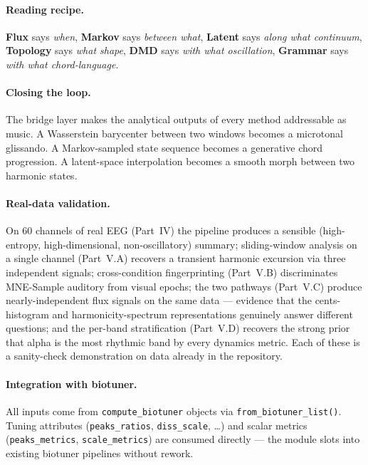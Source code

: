 \documentclass[11pt,a4paper]{article}
\begin{document}
\paragraph{Reading recipe.} \textbf{Flux} says \emph{when}, \textbf{Markov}
says \emph{between what}, \textbf{Latent} says \emph{along what
continuum}, \textbf{Topology} says \emph{what shape}, \textbf{DMD} says
\emph{with what oscillation}, \textbf{Grammar} says \emph{with what
chord-language}.

\paragraph{Closing the loop.} The bridge layer makes the analytical
outputs of every method addressable as music. A Wasserstein barycenter
between two windows becomes a microtonal glissando. A Markov-sampled
state sequence becomes a generative chord progression. A latent-space
interpolation becomes a smooth morph between two harmonic states.

\paragraph{Real-data validation.} On 60 channels of real EEG (Part~IV)
the pipeline produces a sensible (high-entropy, high-dimensional,
non-oscillatory) summary; sliding-window analysis on a single channel
(Part~V.A) recovers a transient harmonic excursion via three independent
signals; cross-condition fingerprinting (Part~V.B) discriminates
MNE-Sample auditory from visual epochs; the two pathways (Part~V.C)
produce nearly-independent flux signals on the same data --- evidence
that the cents-histogram and harmonicity-spectrum representations
genuinely answer different questions; and the per-band stratification
(Part~V.D) recovers the strong prior that alpha is the most rhythmic
band by every dynamics metric. Each of these is a sanity-check
demonstration on data already in the repository.

\paragraph{Integration with biotuner.} All inputs come from
\texttt{compute\_biotuner} objects via
\texttt{from\_biotuner\_list()}. Tuning attributes
(\texttt{peaks\_ratios}, \texttt{diss\_scale}, \dots) and scalar
metrics (\texttt{peaks\_metrics}, \texttt{scale\_metrics}) are consumed
directly --- the module slots into existing biotuner pipelines without
rework.
\end{document}
